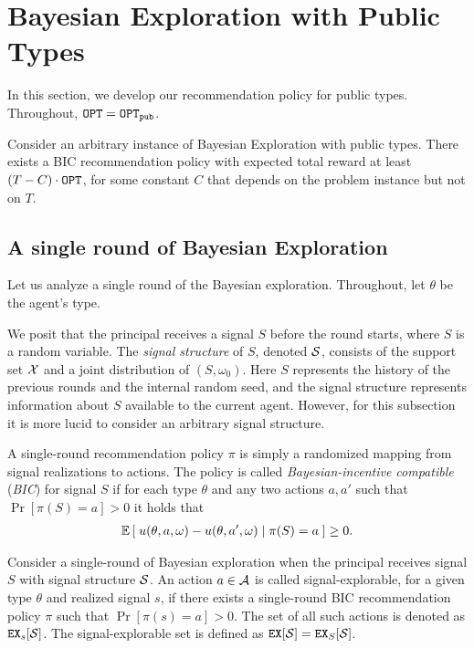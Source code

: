 
\section{Bayesian Exploration with Public Types}
\label{sec:public}

In this section, we develop our recommendation policy for public types. Throughout, $\OPT = \OPTpub$.

\begin{theorem}
\label{thm:public}
Consider an arbitrary instance of Bayesian Exploration with public types.
There exists a BIC recommendation policy with expected total reward at least $\left(T - C \right) \cdot \OPT$, for some constant $C$ that depends on the problem instance but not on $T$.
\end{theorem}

\subsection{A single round of Bayesian Exploration}
\label{sec:public_single}

Let us analyze a single round of the Bayesian exploration. Throughout, let $\theta$ be the agent's type.

We posit that the principal receives a signal $S$ before the round starts, where $S$ is a random variable.  The \emph{signal structure} of $S$, denoted $\S$, consists of the support set $\X$ and a joint distribution of $(S, \omega_0)$. Here $S$ represents the history of the previous rounds and the internal random seed, and the signal structure represents information about $S$ available to the current agent. However, for this subsection it is more lucid to consider an arbitrary signal structure.

A single-round recommendation policy $\pi$ is simply a randomized mapping from signal realizations to actions. The policy is called \emph{Bayesian-incentive compatible} (\emph{BIC}) for signal $S$ if for each type $\theta$ and any two actions $a,a'$ such that $\Pr[\pi(S) = a] > 0$ it holds that
\begin{align}\label{eq:model-BIC-single-round}
\E\left[\; u(\theta,a,\omega) - u(\theta,a',\omega) \mid \pi(S) =a\;\right] \geq 0.
\end{align}

\begin{definition}
Consider a single-round of Bayesian exploration when the principal receives signal $S$ with signal structure $\S$. An action $a \in \A$ is called signal-explorable, for a given type $\theta$ and realized signal $s$, if there exists a single-round BIC recommendation policy $\pi$ such that $\Pr[\pi(s) = a] > 0$. The set of all such actions is denoted as $\EX_s[\S]$. The signal-explorable set is defined as $\EX[\S] = \EX_S[\S]$.
\end{definition}

